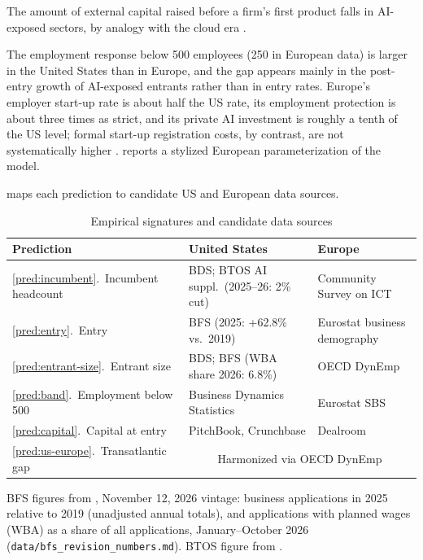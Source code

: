 \begin{prediction}\label{pred:capital}
The amount of external capital raised before a firm's first product falls in AI-exposed sectors, by analogy with the cloud era \citep{ewens2018cost}.
\end{prediction}

\begin{prediction}\label{pred:us-europe}
The employment response below 500 employees (250 in European data) is larger in the United States than in Europe, and the gap appears mainly in the post-entry growth of AI-exposed entrants rather than in entry rates.
Europe's employer start-up rate is about half the US rate, its employment protection is about three times as strict, and its private AI investment is roughly a tenth of the US level; formal start-up registration costs, by contrast, are not systematically higher \citep{eurostat2026bdsize,oecd2020epl,oecd2024pmr,hai2026aiindex}.
 reports a stylized European parameterization of the model.
\end{prediction}

 maps each prediction to candidate US and European data sources.

\begin{table}[t]
  \centering
  \caption{Empirical signatures and candidate data sources}
  \label{tab:signatures}
  \small
  \begin{tabular}{lll}
    \toprule
    Prediction & United States & Europe \\
    \midrule
    \ref{pred:incumbent}.\ Incumbent headcount & BDS; BTOS AI suppl.\ (2025--26: 2\% cut) & Community Survey on ICT \\
    \ref{pred:entry}.\ Entry & BFS (2025: +62.8\% vs.\ 2019) & Eurostat business demography \\
    \ref{pred:entrant-size}.\ Entrant size & BDS; BFS (WBA share 2026: 6.8\%) & OECD DynEmp \\
    \ref{pred:band}.\ Employment below 500 & Business Dynamics Statistics & Eurostat SBS \\
    \ref{pred:capital}.\ Capital at entry & PitchBook, Crunchbase & Dealroom \\
    \ref{pred:us-europe}.\ Transatlantic gap & \multicolumn{2}{c}{Harmonized via OECD DynEmp} \\
    \bottomrule
  \end{tabular}
  \par\smallskip
  \parbox{\linewidth}{\footnotesize BFS figures from \citet{bfs2026}, November 12, 2026 vintage: business applications in 2025 relative to 2019 (unadjusted annual totals), and applications with planned wages (WBA) as a share of all applications, January--October 2026 (\texttt{data/bfs\_revision\_numbers.md}). BTOS figure from \citet{bonney2026}.}
\end{table}

